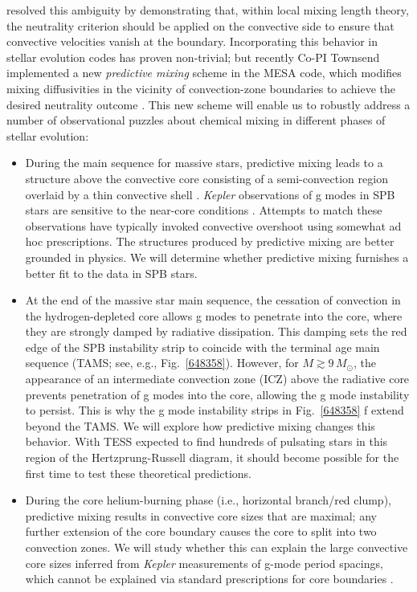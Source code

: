 \citet{Gabriel:2014} resolved this ambiguity by demonstrating that, within local mixing length theory, the neutrality criterion should be applied on the convective side to ensure that convective velocities vanish at the boundary. Incorporating this behavior in stellar evolution codes has proven non-trivial; but recently Co-PI Townsend implemented a new \emph{predictive mixing} scheme in the MESA code, which modifies mixing diffusivities in the vicinity of convection-zone boundaries to achieve the desired neutrality outcome \citep[see][]{Paxton:2017}. This new scheme will enable us to robustly address a number of observational puzzles about chemical mixing in different phases of stellar evolution:
\begin{itemize}

\item During the main sequence for massive stars, predictive mixing leads to a structure above the convective core consisting of a semi-convection region overlaid by a thin convective shell \citep[see, e.g., the right-hand panel in Fig.~4 of][]{Paxton:2017}. \emph{Kepler} observations of g modes in SPB stars are sensitive to the near-core conditions \citep[e.g.,][]{Moravveji:2015}.  Attempts to match these observations have typically invoked convective overshoot using somewhat ad hoc prescriptions. The structures produced by predictive mixing are better grounded in physics. We will determine whether predictive mixing furnishes a better fit to the data in SPB stars.

\item At the end of the massive star main sequence, the cessation of convection in the hydrogen-depleted core allows g modes to penetrate into the core, where they are strongly damped by radiative dissipation. This damping sets the red edge of the SPB instability strip to coincide with the terminal age main sequence (TAMS; see, e.g., Fig.~\ref{648358}). However, for $M \! \gtrsim \! 9\,M_{\odot}$, the appearance of an intermediate convection zone (ICZ) above the radiative core prevents penetration of g modes into the core, allowing the g mode instability to persist. This is why the g mode instability strips in Fig.~\ref{648358} f extend beyond the TAMS. We will explore how predictive mixing changes this behavior. With TESS expected to find hundreds of pulsating stars in this region of the Hertzprung-Russell diagram, it should become possible for the first time to test these theoretical predictions.

\item During the core helium-burning phase (i.e., horizontal branch/red clump), predictive mixing results in convective core sizes that are maximal; any further extension of the core boundary causes the core to split into two convection zones. We will study whether this can explain the large convective core sizes inferred from \emph{Kepler} measurements of g-mode period spacings, which cannot be explained via standard prescriptions for core boundaries \citep[e.g.,][and reference therein]{Constantino:2015}.

\end{itemize}